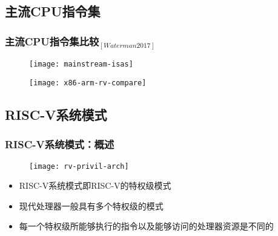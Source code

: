 \subsection{主流CPU指令集}
\begin{frame}
	
	\frametitle{{主流CPU指令集比较$ _{[Waterman 2017]} $}}
	
	\begin{figure}
		\centering
		\texttt{[image: mainstream-isas]}
	\end{figure}
	\pause
	
	\begin{figure}
		\centering
		\texttt{[image: x86-arm-rv-compare]}
	\end{figure}
	
	
	
	
\end{frame}

\subsection{RISC-V系统模式}
\begin{frame}
    \frametitle{RISC-V系统模式：概述}
    
    \begin{figure}
        \centering
        \texttt{[image: rv-privil-arch]}
    \end{figure}
    
    \begin{itemize}
        
        \item RISC-V系统模式即RISC-V的特权级模式
        \item 现代处理器一般具有多个特权级的模式
        \item 每一个特权级所能够执行的指令以及能够访问的处理器资源是不同的
        
    \end{itemize}
    
\end{frame}

